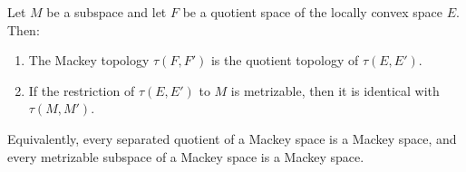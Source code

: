 Let $M$ be a subspace and let $F$ be a quotient space of the locally convex space $E$. Then:
\begin{enumerate}
\item The Mackey topology $\tau(F, F')$ is the quotient topology of $\tau(E, E')$.
\item If the restriction of $\tau(E, E')$ to $M$ is metrizable, then it is identical with $\tau(M, M')$.
\end{enumerate}
Equivalently, every separated quotient of a Mackey space is a Mackey space, and every metrizable subspace of a Mackey space is a Mackey space.
